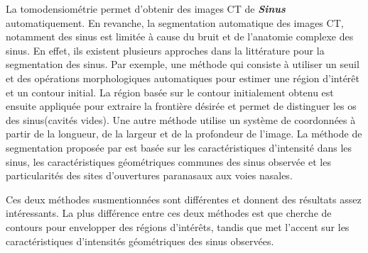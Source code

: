 La tomodensiométrie permet d'obtenir des images CT de \textbf{\textit{Sinus}} automatiquement. En revanche, la segmentation automatique des images CT, notamment des sinus est limitée à cause du bruit et de l'anatomie complexe des sinus. En effet, ils existent plusieurs approches dans la littérature pour la segmentation des sinus. Par exemple, une méthode qui consiste à utiliser un seuil et des opérations morphologiques automatiques pour estimer une région d'intérêt et un contour initial. La région basée sur le contour initialement obtenu est ensuite appliquée pour extraire la frontière désirée\cite{ref1} et permet de distinguer les os des sinus(cavités vides). Une autre méthode utilise un système de coordonnées à partir de la longueur, de la largeur et de la profondeur de l'image\cite{ref0}. La méthode de segmentation proposée par \cite{ref0} est basée sur les caractéristiques d'intensité dans les sinus, les caractéristiques géométriques communes des sinus observée et les particularités des sites d'ouvertures paranasaux aux voies nasales.

Ces deux méthodes susmentionnées sont différentes et donnent des résultats assez intéressants. La plus différence entre ces deux méthodes est que \cite{ref1} cherche de contours pour envelopper des régions d'intérêts, tandis que \cite{ref0} met l'accent sur les caractéristiques d'intensités géométriques des sinus observées.
